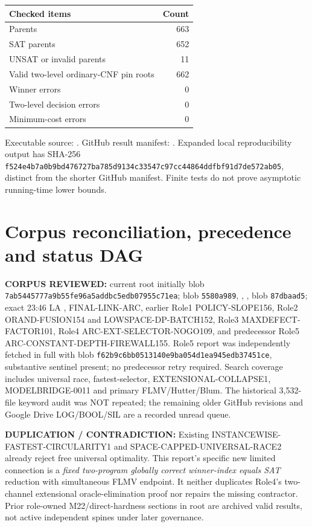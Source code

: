 \documentclass[11pt]{article}
\begin{document}
\begin{center}\begin{tabular}{lr}\toprule
Checked items & Count\\\midrule
Parents & 663\\
SAT parents & 652\\
UNSAT or invalid parents & 11\\
Valid two-level ordinary-CNF pin roots & 662\\
Winner errors & 0\\
Two-level decision errors & 0\\
Minimum-cost errors & 0\\\bottomrule
\end{tabular}\end{center}
Executable source: .
GitHub result manifest: . Expanded local reproducibility output has SHA-256 \texttt{f524e4b7a0b9bd476727ba785d9134c33547c97cc44864ddfbf91d7de572ab05}, distinct from the shorter GitHub manifest. Finite tests do not prove asymptotic running-time lower bounds.

\section{Corpus reconciliation, precedence and status DAG}
\textbf{CORPUS REVIEWED:} current root  initially blob \texttt{7ab5445777a9b55fe96a5addbc5edb07955c71ea};  blob \texttt{5580a989}, , ,  blob \texttt{87dbaad5}; exact 23:46 LA , FINAL-LINK-ARC, earlier Role1 POLICY-SLOPE156, Role2 ORAND-FUSION154 and LOWSPACE-DP-BATCH152, Role3 MAXDEFECT-FACTOR101, Role4 ARC-EXT-SELECTOR-NOGO109, and predecessor Role5 ARC-CONSTANT-DEPTH-FIREWALL155. Role5 report was independently fetched in full with blob \texttt{f62b9c6bb0513140e9ba054d1ea945edb37451ce}, substantive sentinel present; no predecessor retry required. Search coverage includes universal race, fastest-selector, EXTENSIONAL-COLLAPSE1, MODELBRIDGE-0011 and primary FLMV/Hutter/Blum. The historical 3,532-file keyword audit was NOT repeated; the remaining older GitHub revisions and Google Drive LOG/BOOL/SIL are a recorded unread queue.

\textbf{DUPLICATION / CONTRADICTION:} Existing INSTANCEWISE-FASTEST-CIRCULARITY1 and SPACE-CAPPED-UNIVERSAL-RACE2 already reject free universal optimality. This report's specific new limited connection is a \emph{fixed two-program globally correct winner-index equals SAT} reduction with simultaneous FLMV endpoint. It neither duplicates Role4's two-channel extensional oracle-elimination proof nor repairs the missing contractor. Prior role-owned M22/direct-hardness sections in root are archived valid results, not active independent spines under later governance.
\end{document}
